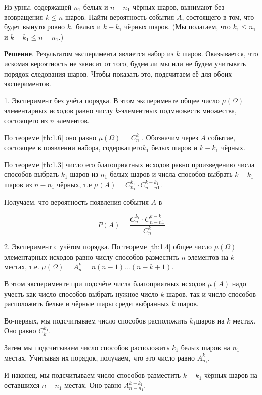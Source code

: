 \begin{num}
Из урны, содержащей $n_1$ белых и $n - n_1$ чёрных шаров,
вынимают без возвращения $k \leq n$ шаров. Найти вероятность события $A$, состоящего в том, что будет вынуто ровно $k_1$ белых и $k-k_1$ чёрных шаров.
(Мы полагаем, что $k_1 \leq n_1$ и $k - k_1 \leq n - n_1$.)
\end{num}

\textbf{Решение}. Результатом эксперимента является набор из $k$ шаров. Оказывается, что искомая вероятность не зависит от того, будем ли мы или не будем учитывать порядок следования шаров. Чтобы показать это, подсчитаем её для обоих экспериментов.

1. Эксперимент без учёта порядка. В этом эксперименте общее число $\mu(\Omega)$ элементарных исходов равно числу $k$-элементных подмножеств множества, состоящего из $n$ элементов.

По теореме \ref{th:1.6} оно равно $\mu(\Omega)$ = $C_n^k$ .
Обозначим через $A$ событие, состоящее в появлении набора, содержащего$ k_1$ белых шаров и $k - k_1$ чёрных. 

По теореме \ref{th:1.3} число его благоприятных исходов равно произведению числа способов выбрать $k_1$ шаров из $n_1$ белых шаров и числа способов выбрать $k - k_1$ шаров из $n - n_1$ чёрных, т.е $\mu(A) = C_{n_1}^{k_1}\cdot C_{n-n1}^{k-k_1}$.

Получаем, что вероятность появления события $A$ в

\begin{equation}
	P(A)=\frac{C_{n_1}^{k_1}\cdot C_{n-n1}^{k-k_1}}{C_n^k}
\end{equation}

2. Эксперимент с учётом порядка. По теореме \ref{th:1.4} общее число $\mu(\Omega)$ элементарных исходов равно числу способов разместить $n$ элементов на $k$
местах, т.е. $\mu(\Omega) = A_n^k = n(n - 1)\ldots(n - k + 1)$.

В этом эксперименте при подсчёте числа благоприятных исходов $\mu(A)$ надо учесть как число способов выбрать нужное число $k$ шаров, так и число способов расположить белые и чёрные шары среди выбранных $k$ шаров.

Во-первых, мы подсчитываем число способов расположить $k_1$шаров на $k$
местах. Оно равно $C_k^{k_1}$. 

Затем мы подсчитываем число способов расположить $k_1$ белых шаров на $n_1$ местах. Учитывая их порядок, получаем, что
это число равно $A_{n_1}^{k_1}$. 

И наконец, мы подсчитываем число способов разместить $k - k_1$ чёрных шаров на оставшихся $n - n_1$ местах. Оно равно $A_{n-n_1}^{k-k_1}$.

